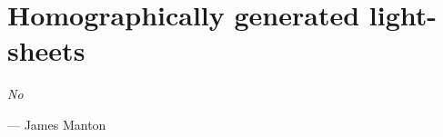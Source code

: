 \ifpdf
    \graphicspath{{Chapters/homography/Figs/Raster/}{Chapters/homography/Figs/PDF/}{Chapters/homography/Figs/}}
\else
    \graphicspath{{Chapters/homography/Figs/Vector/}{Chapters/homography/Figs/}}
\fi

\chapter{Homographically generated light-sheets}\label{chapter:homography}

\epigraph{\emph{No}}{--- James Manton}

